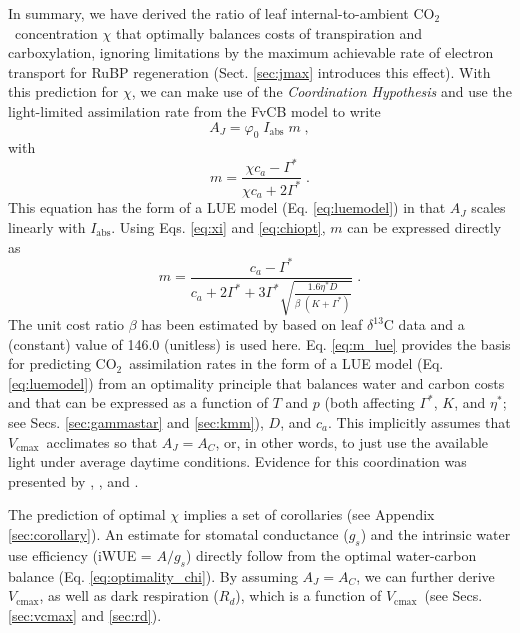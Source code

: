\documentclass{myreport}
\newcommand{\coo}{CO$_2$}
\newcommand{\vcmax}{$V_{\text{cmax}}$}
\begin{document}
In summary, we have derived the ratio of leaf internal-to-ambient \coo\ concentration $\chi$ that optimally balances costs of transpiration and carboxylation, ignoring limitations by the maximum achievable rate of electron transport for RuBP regeneration (Sect. \ref{sec:jmax} introduces this effect). With this prediction for $\chi$, we can make use of the \textit{Coordination Hypothesis} and use the light-limited assimilation rate from the FvCB model to write
\begin{equation}
\label{eq:aj}
        A_J = \varphi_0 \; I_{\mathrm{abs}}\;m \;,
\end{equation}
with
\begin{equation}
\label{eq:m_co2limitation}
    m = \frac{\chi c_a - \Gamma^{\ast}}{\chi c_a + 2\Gamma^{\ast}}\;.
\end{equation}
This equation has the form of a LUE model (Eq. \ref{eq:luemodel}) in that $A_J$ scales linearly with $I_{\mathrm{abs}}$. Using Eqs. \ref{eq:xi} and \ref{eq:chiopt}, $m$ can be expressed directly as
\begin{equation}
\label{eq:m_lue}
    m = \frac{c_a - \Gamma^{\ast}}{c_a + 2 \Gamma^{\ast} + 3 \Gamma^{\ast} \sqrt{\frac{1.6 \eta^{\ast} D }{\beta\;(K+\Gamma^{\ast})}}} \;.
\end{equation}
The unit cost ratio $\beta$ has been estimated by \citet{wang17natpl} based on leaf $\delta^{13}$C data and a (constant) value of 146.0 (unitless) is used here. Eq. \ref{eq:m_lue} provides the basis for predicting \coo\ assimilation rates in the form of a LUE model (Eq. \ref{eq:luemodel}) from an optimality principle that balances water and carbon costs and that can be expressed as a function of $T$ and $p$ (both affecting $\Gamma^{\ast}$, $K$, and $\eta^\ast$; see Secs. \ref{sec:gammastar} and \ref{sec:kmm}), $D$, and $c_a$. This implicitly assumes that \vcmax\ acclimates so that $A_J=A_C$, or, in other words, to just use the available light under average daytime conditions. Evidence for this coordination was presented by \citet{chen93}, \citet{haxeltine96}, and \citet{maire12po}. 

The prediction of optimal $\chi$ implies a set of corollaries (see Appendix \ref{sec:corollary}). An estimate for stomatal conductance ($g_s$) and the intrinsic water use efficiency (iWUE = $A/g_s$) directly follow from the optimal water-carbon balance (Eq. \ref{eq:optimality_chi}). By assuming $A_J=A_C$, we can further derive \vcmax , as well as dark respiration ($R_d$), which is a function of \vcmax\ (see Secs. \ref{sec:vcmax} and \ref{sec:rd}).
\end{document}
